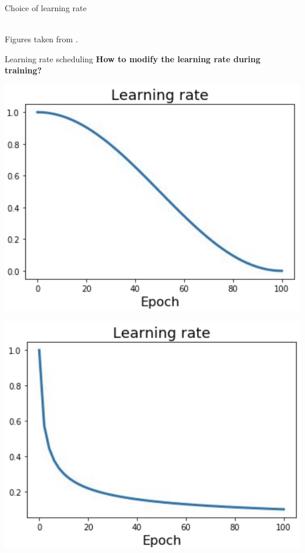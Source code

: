 \begin{frame}{Choice of learning rate}
\begin{minipage}{0.45\linewidth}
\begin{center}
  \end{center}
\end{minipage}\\
\vspace{5mm}
\scriptsize{Figures taken from .}
\end{frame}

\begin{frame}{Learning rate scheduling}
\textbf{How to modify the learning rate during training?}\\
\vspace{5mm}
\begin{minipage}{0.3\linewidth}
  \begin{center}
    \includegraphics[height=0.35\textheight]{figures/lr-schedule-1.png}
  \end{center}
\end{minipage}
\begin{minipage}{0.3\linewidth}
  \begin{center}
    \includegraphics[height=0.35\textheight]{figures/lr-schedule-2.png}
  \end{center}


\end{minipage}
\end{frame}
